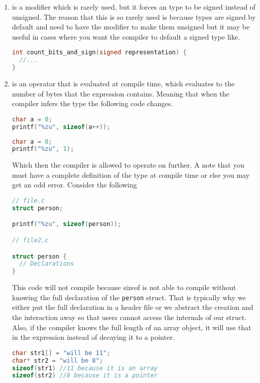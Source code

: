 \begin{enumerate}
	    \item {} is a modifier which is rarely used, but it forces an type to be signed instead of unsigned.
        The reason that this is so rarely used is because types are signed by default and need to have the  modifier to make them unsigned but it may be useful in cases where you want the compiler to default a signed type like.

	      \begin{lstlisting}[language=C]
int count_bits_and_sign(signed representation) {
  //...
}
\end{lstlisting}
	    \item {} is an operator that is evaluated at compile time, which evaluates to the number of bytes that the expression contains.
        Meaning that when the compiler infers the type the following code changes.
	      \begin{lstlisting}[language=C]
char a = 0;
printf("%zu", sizeof(a++));
\end{lstlisting}

	      \begin{lstlisting}[language=C]
char a = 0;
printf("%zu", 1);
\end{lstlisting}

	      Which then the compiler is allowed to operate on further.
        A note that you must have a complete definition of the type at compile time or else you may get an odd error.
        Consider the following

	      \begin{lstlisting}[language=C]
// file.c
struct person;

printf("%zu", sizeof(person));

// file2.c

struct person {
  // Declarations
}
\end{lstlisting}

	      This code will not compile because sizeof is not able to compile  without knowing the full declaration of the \texttt{person} struct.
        That is typically why we either put the full declaration in a header file or we abstract the creation and the interaction away so that users cannot access the internals of our struct.
        Also, if the compiler knows the full length of an array object, it will use that in the expression instead of decaying it to a pointer.

	      \begin{lstlisting}[language=C]
char str1[] = "will be 11";
char* str2 = "will be 8";
sizeof(str1) //11 because it is an array
sizeof(str2) //8 because it is a pointer
\end{lstlisting}


\end{enumerate}
